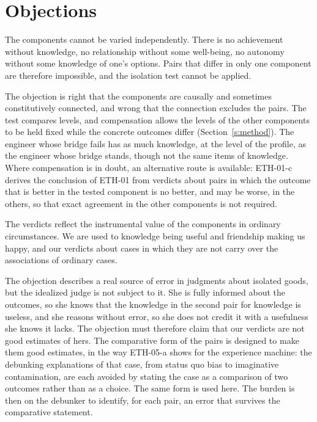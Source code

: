 \documentclass{situationist-preprint}
\begin{document}
\section{Objections}\label{s:obj}

\begin{objection}[Entanglement]\label{o:entangle}
The components cannot be varied independently. There is no achievement without knowledge, no relationship without some well-being, no autonomy without some knowledge of one's options. Pairs that differ in only one component are therefore impossible, and the isolation test cannot be applied.
\end{objection}

\begin{reply}
The objection is right that the components are causally and sometimes constitutively connected, and wrong that the connection excludes the pairs. The test compares levels, and compensation allows the levels of the other components to be held fixed while the concrete outcomes differ (Section~\ref{s:method}). The engineer whose bridge fails has as much knowledge, at the level of the profile, as the engineer whose bridge stands, though not the same items of knowledge. Where compensation is in doubt, an alternative route is available: ETH-01-c derives the conclusion of ETH-01 from verdicts about pairs in which the outcome that is better in the tested component is no better, and may be worse, in the others, so that exact agreement in the other components is not required.
\end{reply}

\begin{objection}[Debunking]
The verdicts reflect the instrumental value of the components in ordinary circumstances. We are used to knowledge being useful and friendship making us happy, and our verdicts about cases in which they are not carry over the associations of ordinary cases.
\end{objection}

\begin{reply}
The objection describes a real source of error in judgments about isolated goods, but the idealized judge is not subject to it. She is fully informed about the outcomes, so she knows that the knowledge in the second pair for knowledge is useless, and she reasons without error, so she does not credit it with a usefulness she knows it lacks. The objection must therefore claim that our verdicts are not good estimates of hers. The comparative form of the pairs is designed to make them good estimates, in the way ETH-05-a shows for the experience machine: the debunking explanations of that case, from status quo bias to imaginative contamination, are each avoided by stating the case as a comparison of two outcomes rather than as a choice. The same form is used here. The burden is then on the debunker to identify, for each pair, an error that survives the comparative statement.
\end{reply}
\end{document}
